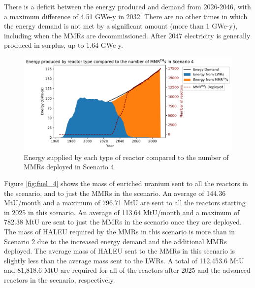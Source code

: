 There is a deficit between the energy produced and  
demand from 2026-2046, with a maximum difference of 4.51 GWe-y in 2032.
There are no other times in which the energy demand is not met by a 
significant amount (more than 1 GWe-y), including when the \glspl{MMR} are 
decommissioned. After 2047 electricity is generally produced in surplus, 
up to 1.64 GWe-y. 

\begin{figure}
    \centering 
    \includegraphics[width=\textwidth]{../figures/energy_scenario4.pdf}
    \caption{Energy supplied by each type of reactor compared to the number of 
    \glspl{MMR} deployed in Scenario 4.}
    \label{fig:energy_rx_4}
\end{figure}

Figure \ref{fig:fuel_4} shows the mass of enriched uranium sent to all the 
reactors in the scenario, and to just the \glspl{MMR} 
in the scenario. An average of 144.36 MtU/month and a maximum of 796.71 MtU
are sent to all the reactors starting in 2025 in this scenario. An average of 
113.64 MtU/month and a maximum of 782.38 MtU are sent to just the \glspl{MMR}
in the scenario once they are deployed. The mass of \gls{HALEU}
required by the \glspl{MMR} in this scenario is more than  
in Scenario 2 due to the increased energy 
demand and the additional \glspl{MMR} deployed. The 
average mass of \gls{HALEU} sent to the \glspl{MMR} in this scenario is 
slightly less than the average mass sent to the \glspl{LWR}. 
A total of 112,453.6 MtU and 81,818.6 MtU are required for all of the 
reactors after 2025 and the advanced reactors in the scenario, respectively. 

